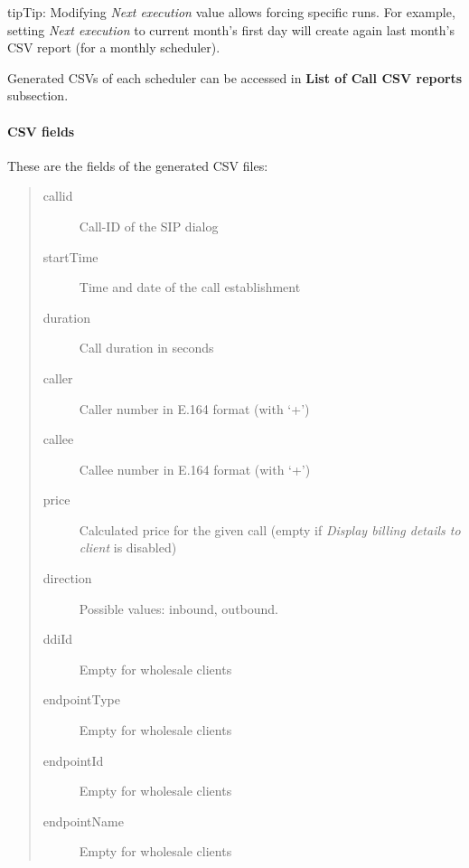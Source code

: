 \documentclass[letterpaper,10pt,english]{sphinxmanual}
\begin{document}
\begin{notice}{tip}{Tip:}
Modifying \emph{Next execution} value allows forcing specific runs. For example, setting \emph{Next execution} to
current month's first day will create again last month's CSV report (for a monthly scheduler).
\end{notice}

Generated CSVs of each scheduler can be accessed in \textbf{List of Call CSV reports} subsection.


\paragraph{CSV fields}
\label{administration_portal/client/wholesale/calls/call_csv_schedulers:csv-fields}
These are the fields of the generated CSV files:
\begin{quote}
\begin{description}
\item[{callid}] \leavevmode
Call-ID of the SIP dialog

\item[{startTime}] \leavevmode
Time and date of the call establishment

\item[{duration}] \leavevmode
Call duration in seconds

\item[{caller}] \leavevmode
Caller number in E.164 format (with `+')

\item[{callee}] \leavevmode
Callee number in E.164 format (with `+')

\item[{price}] \leavevmode
Calculated price for the given call (empty if \emph{Display billing details to client} is disabled)

\item[{direction}] \leavevmode
Possible values: inbound, outbound.

\item[{ddiId}] \leavevmode
Empty for wholesale clients

\item[{endpointType}] \leavevmode
Empty for wholesale clients

\item[{endpointId}] \leavevmode
Empty for wholesale clients

\item[{endpointName}] \leavevmode
Empty for wholesale clients

\end{description}
\end{quote}
\end{document}
